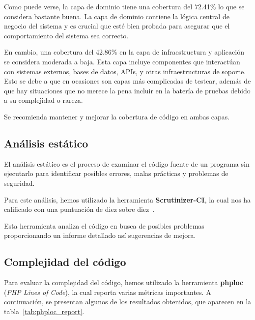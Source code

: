 Como puede verse, la capa de dominio tiene una cobertura del 72.41\% lo que se considera bastante buena.
La capa de dominio contiene la lógica central de negocio del sistema y es crucial que esté bien probada para asegurar
que el comportamiento del sistema sea correcto.

En cambio, una cobertura del 42.86\% en la capa de infraestructura y aplicación se considera moderada a baja.
Esta capa incluye componentes que interactúan con sistemas externos, bases de datos, APIs, y otras infraestructuras de
soporte.
Esto se debe a que en ocasiones son capas más complicadas de testear, además de que hay situaciones que no merece la
pena incluir en la batería de pruebas debido a su complejidad o rareza.

Se recomienda mantener y mejorar la cobertura de código en ambas capas.

\subsection*{Análisis estático}

El análisis estático es el proceso de examinar el código fuente de un programa sin ejecutarlo para identificar posibles
errores, malas prácticas y problemas de seguridad.

Para este análisis, hemos utilizado la herramienta \textbf{Scrutinizer-CI}, la cual nos ha calificado con una puntuación
de diez sobre diez~\cite{url_scrutinizer_viu_84_proyecto}.

Esta herramienta analiza el código en busca de posibles problemas proporcionando un informe detallado así
sugerencias de mejora.


\subsection*{Complejidad del código}

Para evaluar la complejidad del código, hemos utilizado la herramienta \textbf{phploc} (\textit{PHP Lines of Code}), la
cual reporta varias métricas importantes.
A continuación, se presentan algunos de los resultados obtenidos, que aparecen en la tabla~\ref{tab:phploc_report}.


